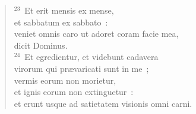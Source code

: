 \begin{flushleft}
\begin{verse}
${}^{23}$~Et erit mensis ex mense,\\ et sabbatum ex sabbato~:\\ veniet omnis caro ut adoret coram facie mea,\\ dicit Dominus.\\
${}^{24}$~Et egredientur, et videbunt cadavera\\ virorum qui pr\ae varicati sunt in me~;\\ vermis eorum non morietur,\\ et ignis eorum non extinguetur~:\\ et erunt usque ad satietatem visionis omni carni.\end{verse}\end{flushleft}


